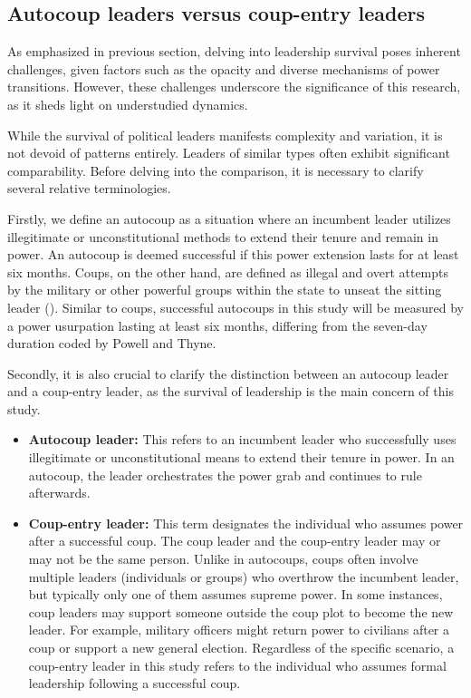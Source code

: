 \documentclass[
  12pt,
]{report}
\begin{document}
\subsection{Autocoup leaders versus coup-entry
leaders}\label{autocoup-leaders-versus-coup-entry-leaders}

As emphasized in previous section, delving into leadership survival
poses inherent challenges, given factors such as the opacity and diverse
mechanisms of power transitions. However, these challenges underscore
the significance of this research, as it sheds light on understudied
dynamics.

While the survival of political leaders manifests complexity and
variation, it is not devoid of patterns entirely. Leaders of similar
types often exhibit significant comparability. Before delving into the
comparison, it is necessary to clarify several relative terminologies.

Firstly, we define an autocoup as a situation where an incumbent leader
utilizes illegitimate or unconstitutional methods to extend their tenure
and remain in power. An autocoup is deemed successful if this power
extension lasts for at least six months. Coups, on the other hand, are
defined as illegal and overt attempts by the military or other powerful
groups within the state to unseat the sitting leader
(). Similar to
coups, successful autocoups in this study will be measured by a power
usurpation lasting at least six months, differing from the seven-day
duration coded by Powell and Thyne.

Secondly, it is also crucial to clarify the distinction between an
autocoup leader and a coup-entry leader, as the survival of leadership
is the main concern of this study.

\begin{itemize}
\item
  \textbf{Autocoup leader:} This refers to an incumbent leader who
  successfully uses illegitimate or unconstitutional means to extend
  their tenure in power. In an autocoup, the leader orchestrates the
  power grab and continues to rule afterwards.
\item
  \textbf{Coup-entry leader:} This term designates the individual who
  assumes power after a successful coup. The coup leader and the
  coup-entry leader may or may not be the same person. Unlike in
  autocoups, coups often involve multiple leaders (individuals or
  groups) who overthrow the incumbent leader, but typically only one of
  them assumes supreme power. In some instances, coup leaders may
  support someone outside the coup plot to become the new leader. For
  example, military officers might return power to civilians after a
  coup or support a new general election. Regardless of the specific
  scenario, a coup-entry leader in this study refers to the individual
  who assumes formal leadership following a successful coup.
\end{itemize}
\end{document}
